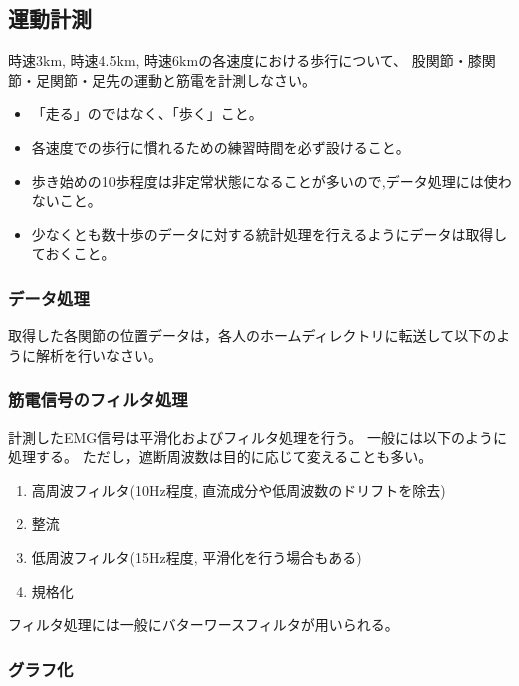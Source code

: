 \documentclass{jarticle}
\begin{document}
\subsection{運動計測}

時速3km, 時速4.5km, 時速6kmの各速度における歩行について、
股関節・膝関節・足関節・足先の運動と筋電を計測しなさい。
\begin{itemize}
\item 「走る」のではなく、「歩く」こと。
\item 各速度での歩行に慣れるための練習時間を必ず設けること。
\item 歩き始めの10歩程度は非定常状態になることが多いので,データ処理には使わないこと。
\item 少なくとも数十歩のデータに対する統計処理を行えるようにデータは取得しておくこと。
\end{itemize}

\subsubsection{データ処理}
取得した各関節の位置データは，各人のホームディレクトリに転送して以下のように解析を行いなさい。

\subsubsection{筋電信号のフィルタ処理}

計測したEMG信号は平滑化およびフィルタ処理を行う。
一般には以下のように処理する。
ただし，遮断周波数は目的に応じて変えることも多い。
\begin{enumerate}
  \item 高周波フィルタ(10Hz程度, 直流成分や低周波数のドリフトを除去)
  \item 整流
  \item 低周波フィルタ(15Hz程度, 平滑化を行う場合もある)
  \item 規格化
\end{enumerate}
フィルタ処理には一般にバターワースフィルタが用いられる。

\subsubsection{グラフ化}
\end{document}
